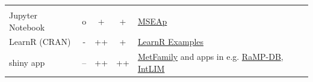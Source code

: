 \documentclass[]{article}
\begin{document}
\begin{longtable}[]{@{}lcccl@{}}
\begin{minipage}[t]{0.52\columnwidth}
\end{minipage}\tabularnewline
\begin{minipage}[t]{0.07\columnwidth}\raggedright
Jupyter Notebook\strut
\end{minipage} & \begin{minipage}[t]{0.12\columnwidth}\centering
o\strut
\end{minipage} & \begin{minipage}[t]{0.10\columnwidth}\centering
+\strut
\end{minipage} & \begin{minipage}[t]{0.05\columnwidth}\centering
+\strut
\end{minipage} & \begin{minipage}[t]{0.52\columnwidth}\raggedright
\href{https://mybinder.org/v2/gh/afukushima/MSEAp/master}{MSEAp}\strut
\end{minipage}\tabularnewline
\begin{minipage}[t]{0.07\columnwidth}\raggedright
LearnR (CRAN)\strut
\end{minipage} & \begin{minipage}[t]{0.12\columnwidth}\centering
-\strut
\end{minipage} & \begin{minipage}[t]{0.10\columnwidth}\centering
++\strut
\end{minipage} & \begin{minipage}[t]{0.05\columnwidth}\centering
+\strut
\end{minipage} & \begin{minipage}[t]{0.52\columnwidth}\raggedright
\href{https://rstudio.github.io/learnr/examples.html}{LearnR Examples}\strut
\end{minipage}\tabularnewline
\begin{minipage}[t]{0.07\columnwidth}\raggedright
shiny app\strut
\end{minipage} & \begin{minipage}[t]{0.12\columnwidth}\centering
--\strut
\end{minipage} & \begin{minipage}[t]{0.10\columnwidth}\centering
++\strut
\end{minipage} & \begin{minipage}[t]{0.05\columnwidth}\centering
++\strut
\end{minipage} & \begin{minipage}[t]{0.52\columnwidth}\raggedright
\href{https://msbi.ipb-halle.de/MetFamily/}{MetFamily} and apps in e.g. \href{https://github.com/Mathelab/RaMP-DB}{RaMP-DB}, \href{https://github.com/Mathelab/IntLIM}{IntLIM}\strut
\end{minipage}\tabularnewline
\bottomrule
\end{longtable}
\end{document}

